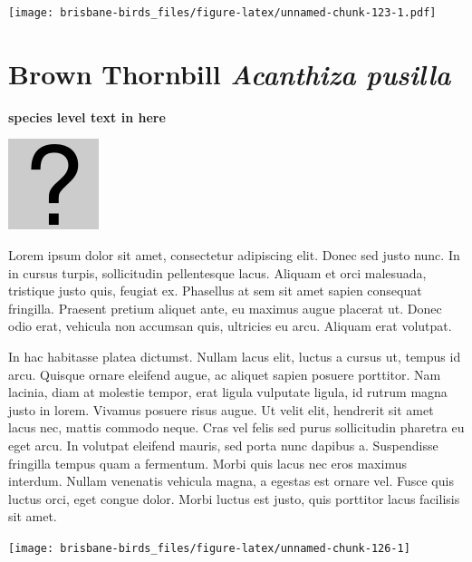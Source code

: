 \documentclass[]{book}
\let\origfigure\figure
\let\endorigfigure\endfigure
\renewenvironment{figure}[1][2] {
  \expandafter\origfigure\expandafter[H]
} {
  \endorigfigure
}
\begin{document}
\begin{figure}
\centering
\texttt{[image: brisbane-birds\_files/figure-latex/unnamed-chunk-123-1.pdf]}
\caption{\label{fig:unnamed-chunk-123}insert figure caption}
\end{figure}

\section{\texorpdfstring{Brown Thornbill \emph{Acanthiza
pusilla}}{Brown Thornbill Acanthiza pusilla}}\label{brown-thornbill-acanthiza-pusilla}

\textbf{species level text in here}

\begin{figure}
\centering
\includegraphics{assets/missing.png}
\caption{No image for species}
\end{figure}

Lorem ipsum dolor sit amet, consectetur adipiscing elit. Donec sed justo
nunc. In in cursus turpis, sollicitudin pellentesque lacus. Aliquam et
orci malesuada, tristique justo quis, feugiat ex. Phasellus at sem sit
amet sapien consequat fringilla. Praesent pretium aliquet ante, eu
maximus augue placerat ut. Donec odio erat, vehicula non accumsan quis,
ultricies eu arcu. Aliquam erat volutpat.

In hac habitasse platea dictumst. Nullam lacus elit, luctus a cursus ut,
tempus id arcu. Quisque ornare eleifend augue, ac aliquet sapien posuere
porttitor. Nam lacinia, diam at molestie tempor, erat ligula vulputate
ligula, id rutrum magna justo in lorem. Vivamus posuere risus augue. Ut
velit elit, hendrerit sit amet lacus nec, mattis commodo neque. Cras vel
felis sed purus sollicitudin pharetra eu eget arcu. In volutpat eleifend
mauris, sed porta nunc dapibus a. Suspendisse fringilla tempus quam a
fermentum. Morbi quis lacus nec eros maximus interdum. Nullam venenatis
vehicula magna, a egestas est ornare vel. Fusce quis luctus orci, eget
congue dolor. Morbi luctus est justo, quis porttitor lacus facilisis sit
amet.

\begin{figure}
\texttt{[image: brisbane-birds\_files/figure-latex/unnamed-chunk-126-1]} \caption{insert figure caption}\label{fig:unnamed-chunk-126}
\end{figure}
\end{document}
